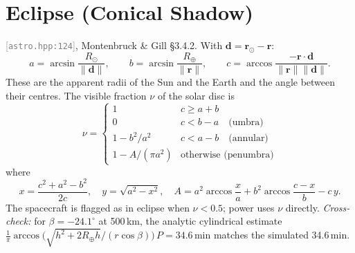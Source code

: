 \documentclass[11pt,a4paper]{article}
\newcommand{\vb}[1]{\boldsymbol{#1}}
\newcommand{\src}[1]{\textcolor{gray}{\small[\texttt{#1}]}}
\begin{document}
\section{Eclipse (Conical Shadow)}
\src{astro.hpp:124}, Montenbruck \& Gill \S3.4.2. With $\vb d = \vb r_\odot - \vb r$:
\begin{equation}
a = \arcsin\frac{R_\odot}{\lVert\vb d\rVert},\qquad
b = \arcsin\frac{R_\oplus}{\lVert\vb r\rVert},\qquad
c = \arccos\frac{-\vb r\cdot\vb d}{\lVert\vb r\rVert\lVert\vb d\rVert}.
\end{equation}
These are the apparent radii of the Sun and the Earth and the angle between their centres. The visible fraction $\nu$ of the solar disc is
\begin{equation}
\nu = \begin{cases}
1 & c \ge a+b\\
0 & c < b-a \quad\text{(umbra)}\\
1 - b^2/a^2 & c < a-b \quad\text{(annular)}\\
1 - A/(\pi a^2) & \text{otherwise (penumbra)}
\end{cases}
\end{equation}
where
\begin{equation}
x = \frac{c^2+a^2-b^2}{2c},\quad y = \sqrt{a^2-x^2},\quad
A = a^2\arccos\frac{x}{a} + b^2\arccos\frac{c-x}{b} - c\,y .
\end{equation}
The spacecraft is flagged as in eclipse when $\nu < 0.5$; power uses $\nu$ directly.
\emph{Cross-check:} for $\beta = -24.1^\circ$ at 500\,km, the analytic cylindrical estimate $\tfrac{1}{\pi}\arccos\!\big(\sqrt{h^2+2R_\oplus h}/(r\cos\beta)\big)\,P = 34.6$\,min matches the simulated 34.6\,min.

\end{document}
